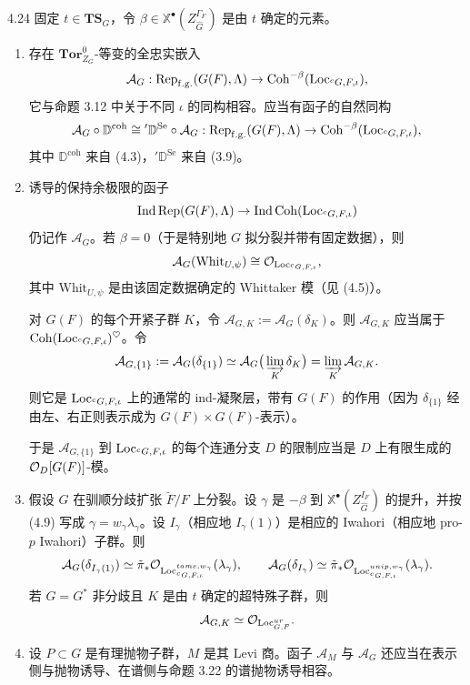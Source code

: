 \begin{conj}{4.24}
固定 $t\in\mathbf{TS}_G$，令 $\beta\in\mathbb{X}^\bullet(Z_{\hat G}^{\Gamma_F})$ 是由 $t$ 确定的元素。
\begin{enumerate}[label=(\arabic*),leftmargin=1.8em,itemsep=0.3em]
\item 存在 $\mathbf{Tor}^0_{Z_G}$-等变的全忠实嵌入
\[
\mathcal{A}_G:\operatorname{Rep}_{\mathrm{f.g.}}(G(F),\Lambda)\to\operatorname{Coh}^{-\beta}(\operatorname{Loc}_{{}^cG,F,\iota}),
\]
它与命题 3.12 中关于不同 $\iota$ 的同构相容。应当有函子的自然同构
\[
\mathcal{A}_G\circ\mathbb{D}^{\mathrm{coh}}\cong{}'\mathbb{D}^{\mathrm{Se}}\circ\mathcal{A}_G:
\operatorname{Rep}_{\mathrm{f.g.}}(G(F),\Lambda)\to\operatorname{Coh}^{-\beta}(\operatorname{Loc}_{{}^cG,F,\iota}),
\]
其中 $\mathbb{D}^{\mathrm{coh}}$ 来自 (4.3)，${}'\mathbb{D}^{\mathrm{Se}}$ 来自 (3.9)。
\item 诱导的保持余极限的函子
\[
\operatorname{Ind}\operatorname{Rep}(G(F),\Lambda)\to\operatorname{Ind}\operatorname{Coh}(\operatorname{Loc}_{{}^cG,F,\iota})
\]
仍记作 $\mathcal{A}_G$。若 $\beta=0$（于是特别地 $G$ 拟分裂并带有固定数据），则
\[
\mathcal{A}_G(\mathrm{Whit}_{U,\psi})\cong\mathcal{O}_{\operatorname{Loc}_{{}^cG,F,\iota}},
\]
其中 $\mathrm{Whit}_{U,\psi}$ 是由该固定数据确定的 Whittaker 模（见 (4.5)）。

对 $G(F)$ 的每个开紧子群 $K$，令 $\mathcal{A}_{G,K}:=\mathcal{A}_G(\delta_K)$。则 $\mathcal{A}_{G,K}$ 应当属于 $\operatorname{Coh}(\operatorname{Loc}_{{}^cG,F,\iota})^{\heartsuit}$。令
\[
\mathcal{A}_{G,\{1\}}:=\mathcal{A}_G(\delta_{\{1\}})\simeq\mathcal{A}_G\big(\varinjlim_K\delta_K\big)=\varinjlim_K\mathcal{A}_{G,K}.
\]
则它是 $\operatorname{Loc}_{{}^cG,F,\iota}$ 上的通常的 ind-凝聚层，带有 $G(F)$ 的作用（因为 $\delta_{\{1\}}$ 经由左、右正则表示成为 $G(F)\times G(F)$-表示）。

于是 $\mathcal{A}_{G,\{1\}}$ 到 $\operatorname{Loc}_{{}^cG,F,\iota}$ 的每个连通分支 $D$ 的限制应当是 $D$ 上有限生成的 $\mathcal{O}_D[G(F)]$-模。
\item 假设 $G$ 在驯顺分歧扩张 $\breve F/F$ 上分裂。设 $\gamma$ 是 $-\beta$ 到 $\mathbb{X}^\bullet(Z_{\hat G}^{I_F})$ 的提升，并按 (4.9) 写成 $\gamma=w_\gamma\lambda_\gamma$。设 $I_\gamma$（相应地 $I_\gamma(1)$）是相应的 Iwahori（相应地 pro-$p$ Iwahori）子群。则
\[
\mathcal{A}_G(\delta_{I_\gamma(1)})\simeq\tilde\pi_*\mathcal{O}_{\operatorname{Loc}^{tame,w_\gamma}_{{}^cG,F,\iota}}(\lambda_\gamma),\qquad
\mathcal{A}_G(\delta_{I_\gamma})\simeq\tilde\pi_*\mathcal{O}_{\operatorname{Loc}^{unip,w_\gamma}_{{}^cG,F,\iota}}(\lambda_\gamma).
\]
若 $G=G^*$ 非分歧且 $K$ 是由 $t$ 确定的超特殊子群，则
\[
\mathcal{A}_{G,K}\simeq\mathcal{O}_{\operatorname{Loc}^{ur}_{G,F}}.
\]
\item 设 $P\subset G$ 是有理抛物子群，$M$ 是其 Levi 商。函子 $\mathcal{A}_M$ 与 $\mathcal{A}_G$ 还应当在表示侧与抛物诱导、在谱侧与命题 3.22 的谱抛物诱导相容。
\end{enumerate}
\end{conj}

